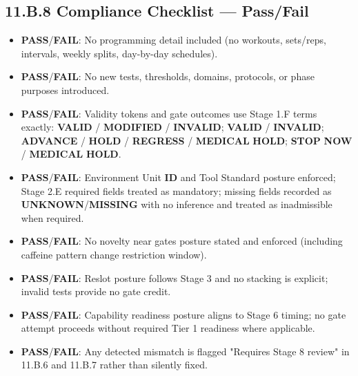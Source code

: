 \documentclass[10pt]{article}
\begin{document}
\newpage
\subsection*{11.B.8 Compliance Checklist — Pass/Fail}
{}

\begin{itemize}
\item \textbf{PASS}/\textbf{FAIL}: No programming detail included (no workouts, sets/reps, intervals, weekly splits, day-by-day schedules).
\item \textbf{PASS}/\textbf{FAIL}: No new tests, thresholds, domains, protocols, or phase purposes introduced.
\item \textbf{PASS}/\textbf{FAIL}: Validity tokens and gate outcomes use Stage 1.F terms exactly: \textbf{VALID} / \textbf{MODIFIED} / \textbf{INVALID}; \textbf{VALID} / \textbf{INVALID}; \textbf{ADVANCE} / \textbf{HOLD} / \textbf{REGRESS} / \textbf{MEDICAL} \textbf{HOLD}; \textbf{STOP} \textbf{NOW} / \textbf{MEDICAL} \textbf{HOLD}.
\item \textbf{PASS}/\textbf{FAIL}: Environment Unit \textbf{ID} and Tool Standard posture enforced; Stage 2.E required fields treated as mandatory; missing fields recorded as \textbf{UNKNOWN}/\textbf{MISSING} with no inference and treated as inadmissible when required.
\item \textbf{PASS}/\textbf{FAIL}: No novelty near gates posture stated and enforced (including caffeine pattern change restriction window).
\item \textbf{PASS}/\textbf{FAIL}: Reslot posture follows Stage 3 and no stacking is explicit; invalid tests provide no gate credit.
\item \textbf{PASS}/\textbf{FAIL}: Capability readiness posture aligns to Stage 6 timing; no gate attempt proceeds without required Tier 1 readiness where applicable.
\item \textbf{PASS}/\textbf{FAIL}: Any detected mismatch is flagged "Requires Stage 8 review" in 11.B.6 and 11.B.7 rather than silently fixed.
\end{itemize}
\end{document}
